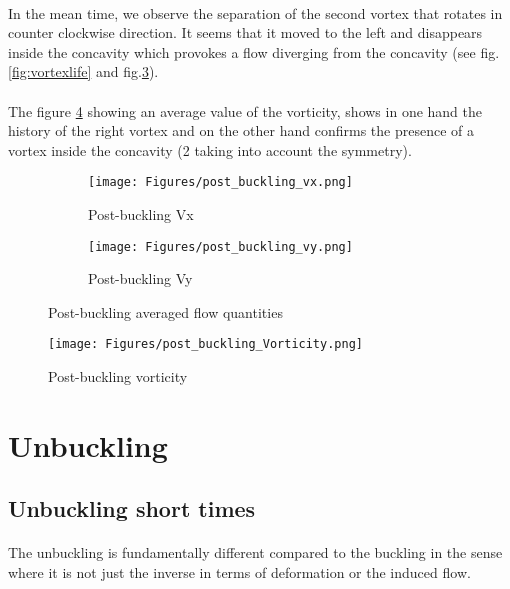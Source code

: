 \documentclass[a4paper,10pt]{report}
\begin{document}
\paragraph{}
In the mean time, we observe the separation of the second vortex that rotates in counter clockwise direction. It seems that it moved to the left and disappears inside the concavity which provokes a flow diverging from the concavity (see fig.\ref{fig:vortexlife} and fig.\ref{fig:PostbucklingAveragedquantities}).
\paragraph{}
The figure \ref{fig:Postbucklingvorticity} showing an average value of the vorticity, shows in one hand the history of the right vortex and on the other hand confirms the presence of a vortex inside the concavity (2 taking into account the symmetry).

\begin{figure}[htbp]%
	\centering%
	 \begin{subfigure}[t]{0.5\textwidth}%
        \texttt{[image: Figures/post\_buckling\_vx.png]}%
        \caption{Post-buckling Vx}%
				\label{fig:PostbucklingVx}%
    \end{subfigure}%
    \begin{subfigure}[t]{0.5\textwidth}%
        \texttt{[image: Figures/post\_buckling\_vy.png]}%
        \caption{Post-buckling Vy}%
        \label{fig:PostbucklingVy}%
    \end{subfigure}%
		\caption{Post-buckling averaged flow quantities}%
		\label{fig:PostbucklingAveragedquantities}%
\end{figure}
\begin{figure}[htbp]%
	\centering%
 	 \texttt{[image: Figures/post\_buckling\_Vorticity.png]}%
	 \caption{Post-buckling vorticity}%
	 \label{fig:Postbucklingvorticity}%
\end{figure}
\section{Unbuckling}
\subsection{Unbuckling short times}
\paragraph{}
The unbuckling is fundamentally different compared to the buckling in the sense where it is not just the inverse in terms of deformation or the induced flow.
\end{document}
